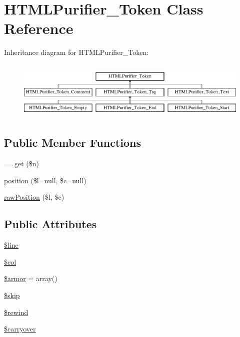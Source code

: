 \hypertarget{classHTMLPurifier__Token}{\section{H\+T\+M\+L\+Purifier\+\_\+\+Token Class Reference}
\label{classHTMLPurifier__Token}
}
Inheritance diagram for H\+T\+M\+L\+Purifier\+\_\+\+Token\+:\begin{figure}[H]
\begin{center}
\leavevmode
\includegraphics[height=2.871795cm]{classHTMLPurifier__Token}
\end{center}
\end{figure}
\subsection*{Public Member Functions}
\begin{DoxyCompactItemize}
\item 
\hyperlink{classHTMLPurifier__Token_a8c51419f0902e1855b61997fa0e37278}{\+\_\+\+\_\+get} (\$n)
\item 
\hyperlink{classHTMLPurifier__Token_ae5fbc90f102d5a0b754bd1b6206ce59d}{position} (\$l=null, \$c=null)
\item 
\hyperlink{classHTMLPurifier__Token_a53f9c2c200d4de64d5453866223a65a3}{raw\+Position} (\$l, \$c)
\end{DoxyCompactItemize}
\subsection*{Public Attributes}
\begin{DoxyCompactItemize}
\item 
\hyperlink{classHTMLPurifier__Token_a64cba5bdee6d525377b8fe33109122b4}{\$line}
\item 
\hyperlink{classHTMLPurifier__Token_ae063b7efb1fb056d4abad981d5237a71}{\$col}
\item 
\hyperlink{classHTMLPurifier__Token_a3379dcc5aa96a30f90e15b7823cc54db}{\$armor} = array()
\item 
\hyperlink{classHTMLPurifier__Token_af7eba36dca16eab138ff7823444f2ca0}{\$skip}
\item 
\hyperlink{classHTMLPurifier__Token_ae6284c7aa38e04e9e2b117e2029ef8c3}{\$rewind}
\item 
\hyperlink{classHTMLPurifier__Token_ac83c86cb9f4e65a872bb1b4330224533}{\$carryover}
\end{DoxyCompactItemize}


